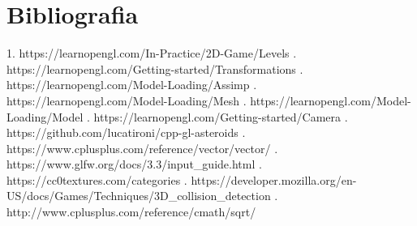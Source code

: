 \chapter{Bibliografia}
\label{chap:bibliografia}
1. https://learnopengl.com/In-Practice/2D-Game/Levels
. https://learnopengl.com/Getting-started/Transformations
. https://learnopengl.com/Model-Loading/Assimp
. https://learnopengl.com/Model-Loading/Mesh
. https://learnopengl.com/Model-Loading/Model
. https://learnopengl.com/Getting-started/Camera
. https://github.com/lucatironi/cpp-gl-asteroids
. https://www.cplusplus.com/reference/vector/vector/
. https://www.glfw.org/docs/3.3/input_guide.html
. https://cc0textures.com/categories
. https://developer.mozilla.org/en-US/docs/Games/Techniques/3D_collision_detection
. http://www.cplusplus.com/reference/cmath/sqrt/